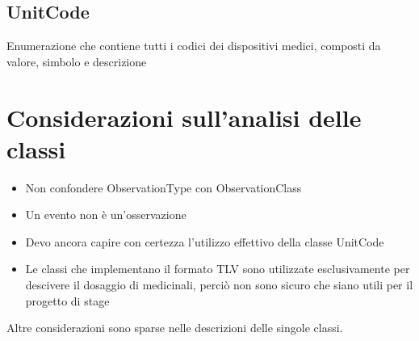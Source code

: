 \documentclass[a4paper]{article}
\begin{document}
        \subsection{UnitCode}
            Enumerazione che contiene tutti i codici dei dispositivi medici, composti da valore, simbolo e descrizione
    \section{Considerazioni sull'analisi delle classi}
        \begin{itemize}
            \item Non confondere ObservationType con ObservationClass
            \item Un evento non è un'osservazione
            \item Devo ancora capire con certezza l'utilizzo effettivo della classe UnitCode
            \item Le classi che implementano il formato TLV sono utilizzate esclusivamente per descivere il dosaggio di medicinali, perciò non sono sicuro che siano utili per il progetto di stage
        \end{itemize}
        Altre considerazioni sono sparse nelle descrizioni delle singole classi.
\end{document}
